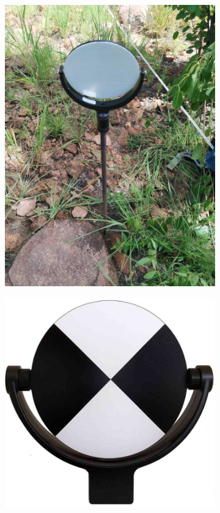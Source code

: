 \begin{refsection}
\begin{figure}
	\begin{subfigure}{0.45\linewidth}
		\includegraphics[width=\linewidth]{img/target_situ}
		\caption{}
		\label{workflow:target_situ}
	\end{subfigure}
	\hfill
	\begin{subfigure}{0.45\linewidth}
		\includegraphics[width=\linewidth]{img/target_face}

\end{subfigure}
\end{figure}
\end{refsection}
